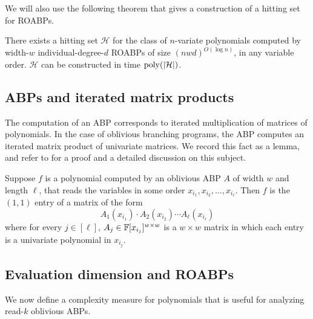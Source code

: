 \documentclass[11pt]{article}
\newcommand{\cH}{\mathcal{H}}
\begin{document}
We will also use the following theorem that gives a construction of a hitting set for ROABPs.

\begin{theorem}
\label{thm:hitting-set-ROABP}
There exists a hitting set $\cH$ for the class of $n$-variate polynomials computed by width-$w$ individual-degree-$d$ ROABPs of size $(nwd)^{O(\log n)}$, in any variable order. $\cH$ can be constructed in time $\poly(|\cH|)$.
\end{theorem}

\subsection{ABPs and iterated matrix products}

The computation of an ABP corresponds to iterated multiplication of matrices of polynomials. In the case of oblivious branching programs, the ABP computes an iterated matrix product of univariate matrices. We record this fact as a lemma, and refer to \cite{forbesphdthesis} for a proof and a detailed discussion on this subject.

\begin{lemmawp}
\label{lem:obv-ABP}
Suppose $f$ is a polynomial computed by an oblivious ABP $A$ of width $w$ and length $\ell$, that reads the variables in some order $x_{i_1}, x_{i_2}, \ldots, x_{i_\ell}$. Then $f$ is the $(1,1)$ entry of a matrix of the form
\[
A_1(x_{i_1}) \cdot A_2(x_{i_2}) \cdots A_\ell(x_{i_\ell})
\]
where for every $j \in [\ell]$, $A_j \in \F[x_{i_j}]^{w \times w}$ is a $w \times w$ matrix in which each entry is a univariate polynomial in $x_{i_j}$.
\end{lemmawp}




\subsection{Evaluation dimension and ROABPs}

We now define a complexity measure for polynomials that is useful for analyzing read-$k$ oblivious ABPs.
\end{document}
